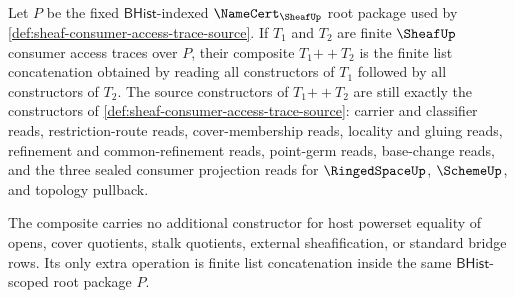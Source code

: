\begin{definition}
\label{def:sheaf-consumer-access-trace-composition-source}
Let $P$ be the fixed $\mathsf{BHist}$-indexed $\NameCert_{\SheafUp}$ root package used by \autoref{def:sheaf-consumer-access-trace-source}. If $T_1$ and $T_2$ are finite $\SheafUp$ consumer access traces over $P$, their composite $T_1 \mathbin{+\!\!+} T_2$ is the finite list concatenation obtained by reading all constructors of $T_1$ followed by all constructors of $T_2$. The source constructors of $T_1 \mathbin{+\!\!+} T_2$ are still exactly the constructors of \autoref{def:sheaf-consumer-access-trace-source}: carrier and classifier reads, restriction-route reads, cover-membership reads, locality and gluing reads, refinement and common-refinement reads, point-germ reads, base-change reads, and the three sealed consumer projection reads for $\RingedSpaceUp$, $\SchemeUp$, and topology pullback.

The composite carries no additional constructor for host powerset equality of opens, cover quotients, stalk quotients, external sheafification, or standard bridge rows. Its only extra operation is finite list concatenation inside the same $\mathsf{BHist}$-scoped root package $P$.
\end{definition}

